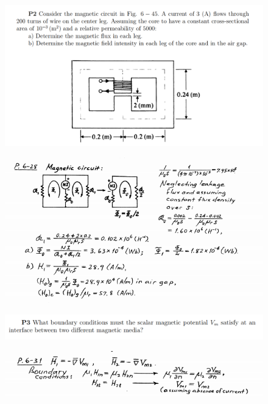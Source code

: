 \documentclass[xcolor={dvipsnames}]{beamer}
\begin{document}
\begin{frame}
\begin{figure}[H]
	\centering
	\includegraphics[width=0.9\linewidth]{7_3.png}
\end{figure}
\end{frame}
\begin{frame}
\begin{figure}[H]
	\centering
	\includegraphics[width=0.9\linewidth]{7_4.png}
\end{figure}
\end{frame}
\begin{frame}
\begin{figure}[H]
	\centering
	\includegraphics[width=0.9\linewidth]{7_5.png}
\end{figure}
\pause
\begin{figure}[H]
	\centering
	\includegraphics[width=0.9\linewidth]{7_6.png}
\end{figure}
\end{frame}
\end{document}
